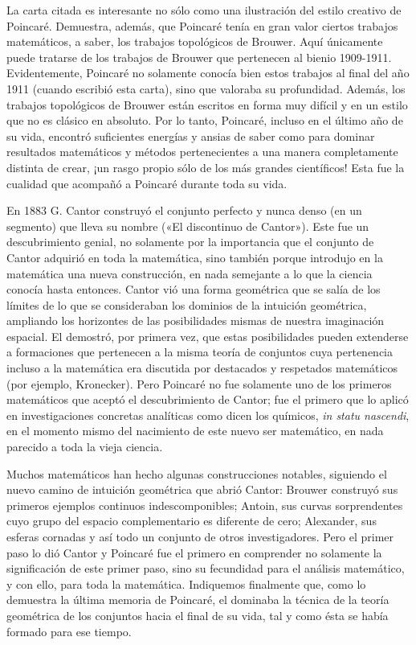 \documentclass[a4paper, 12pt]{article}
\begin{document}
La carta citada es interesante no sólo como una ilustración del estilo creativo de Poincaré. Demuestra, además, que Poincaré tenía en gran valor ciertos trabajos matemáticos, a saber, los trabajos topológicos de Brouwer. Aquí únicamente puede tratarse de los trabajos de Brouwer que pertenecen al bienio 1909-1911. Evidentemente, Poincaré no solamente conocía bien estos trabajos al final del año 1911 (cuando escribió esta carta), sino que valoraba su profundidad. Además, los trabajos topológicos de Brouwer están escritos en forma muy difícil y en un estilo que no es clásico en  absoluto. Por lo tanto, Poincaré, incluso en el último año de su vida, encontró suficientes energías y ansias de saber como para dominar resultados matemáticos y métodos pertenecientes a una manera completamente distinta de crear, ¡un rasgo propio sólo de los más grandes científicos! Esta fue la cualidad que acompañó a Poincaré durante toda su vida. 

En 1883 G. Cantor construyó el conjunto perfecto y nunca denso (en un segmento) que lleva su nombre («El discontinuo de Cantor»). Este fue un descubrimiento genial,
no solamente por la importancia que el conjunto de Cantor adquirió en toda la matemática, sino también porque introdujo en la matemática una nueva construcción, en nada semejante a lo que la ciencia conocía hasta entonces. Cantor vió una forma geométrica que se salía
de los límites de lo que se consideraban los dominios de la intuición geométrica, ampliando los horizontes de las posibilidades mismas de nuestra imaginación espacial. El demostró, por primera vez, que estas posibilidades pueden extenderse a formaciones que pertenecen a la misma teoría de conjuntos cuya pertenencia incluso a la matemática era discutida por destacados y respetados matemáticos (por ejemplo, Kronecker). Pero Poincaré no fue solamente uno de los primeros matemáticos que aceptó el descubrimiento de Cantor; fue el primero que lo aplicó en investigaciones concretas analíticas como dicen los químicos, {\it in statu nascendi}, en el momento mismo del nacimiento de este nuevo ser matemático, en nada parecido a toda la vieja ciencia.

Muchos matemáticos han hecho algunas construcciones notables, siguiendo el nuevo camino de intuición geométrica que abrió Cantor: Brouwer construyó sus primeros ejemplos continuos indescomponibles; Antoin, sus curvas sorprendentes cuyo grupo del espacio complementario es diferente de cero; Alexander, sus esferas cornadas y así todo un conjunto de otros investigadores. Pero el primer paso lo dió Cantor y Poincaré fue el primero en comprender no solamente la significación de este primer paso, sino su fecundidad para el análisis matemático, y con ello, para toda la matemática. Indiquemos finalmente que, como lo demuestra la última memoria de Poincaré, el dominaba la técnica de la teoría geométrica de los conjuntos hacia el final de su vida, tal y como ésta se había formado para
ese tiempo.
\end{document}
